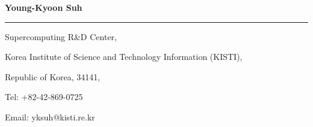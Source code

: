 \documentclass{letter} %
\begin{document}
\signature{Young-Kyoon Suh}           %
\longindentation=0pt                       %
\let\raggedleft\raggedright                %
 
\begin{letter}{
%
}

\begin{flushleft}
{\large\bf Young-Kyoon Suh}
\end{flushleft}
\medskip\hrule height 1pt
\begin{flushright}
\hfill Supercomputing R\&D Center, 
\end{flushright}
\vspace{-.15in}
\begin{flushright}
\hfill Korea Institute of Science and Technology Information (KISTI), 
\end{flushright}
\vspace{-.15in}
\begin{flushright}
\hfill Republic of Korea, 34141, 
\end{flushright}
\vspace{-.15in}
\begin{flushright}
\hfill Tel: +82-42-869-0725
\end{flushright}
\vspace{-.15in}
\begin{flushright}
\hfill Email: yksuh@kisti.re.kr
\end{flushright} 

 

\end{letter}
\end{document}
